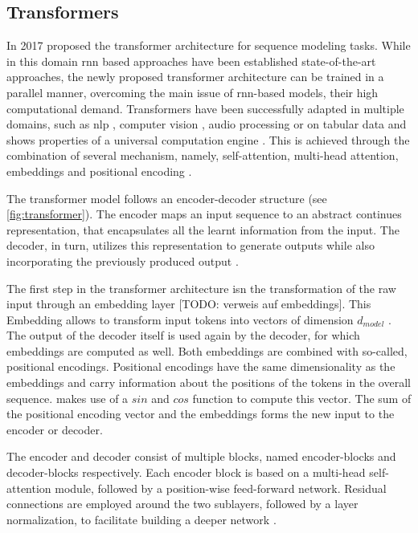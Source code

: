 \subsection{Transformers}
\label{ch:preliminaries-generativeAlgorithms-transformers}

In 2017 \cite{vaswani2017AttentionAllYou} proposed the transformer architecture for sequence modeling tasks.
While in this domain \gls{rnn} based approaches have been established state-of-the-art approaches, the newly proposed transformer architecture can be trained in a parallel manner,
overcoming the main issue of \gls{rnn}-based models, their high computational demand.
Transformers have been successfully adapted in multiple domains, such as \gls{nlp} \cite{gillioz2020OverviewTransformerbasedModels}, computer vision \cite{khan2022TransformersVisionSurvey}, audio processing \cite{gong2022SSASTSelfSupervisedAudio} or on tabular data \cite{huang2020TabTransformerTabularData} 
and shows properties of a universal computation engine \cite{lu2021PretrainedTransformersUniversal, lin2022SurveyTransformers}.
This is achieved through the combination of several mechanism, namely, self-attention, multi-head attention, embeddings and positional encoding \cite{vaswani2017AttentionAllYou}.

The transformer model follows an encoder-decoder structure (see \autoref{fig:transformer}).
The encoder maps an input sequence to an abstract continues representation, that encapsulates all the learnt information from the input.
The decoder, in turn, utilizes this representation to generate outputs while also incorporating the previously produced output \cite{vaswani2017AttentionAllYou}.

The first step in the transformer architecture isn the transformation of the raw input through an embedding layer [TODO: verweis auf embeddings].
This Embedding allows to transform input tokens into vectors of dimension $d_{model}$ \cite{vaswani2017AttentionAllYou}.
The output of the decoder itself is used again by the decoder, for which embeddings are computed as well.
Both embeddings are combined with so-called, positional encodings.
Positional encodings have the same dimensionality as the embeddings and carry information about the positions of the tokens in the overall sequence.
\cite{vaswani2017AttentionAllYou} makes use of a $sin$ and $cos$ function to compute this vector.
The sum of the positional encoding vector and the embeddings forms the new input to the encoder or decoder.

The encoder and decoder consist of multiple blocks, named encoder-blocks and decoder-blocks respectively.
Each encoder block is based on a multi-head self-attention module, followed by a position-wise feed-forward network.
Residual connections are employed around the two sublayers, followed by a layer normalization, to facilitate building a deeper network \cite{vaswani2017AttentionAllYou, lin2022SurveyTransformers}.

